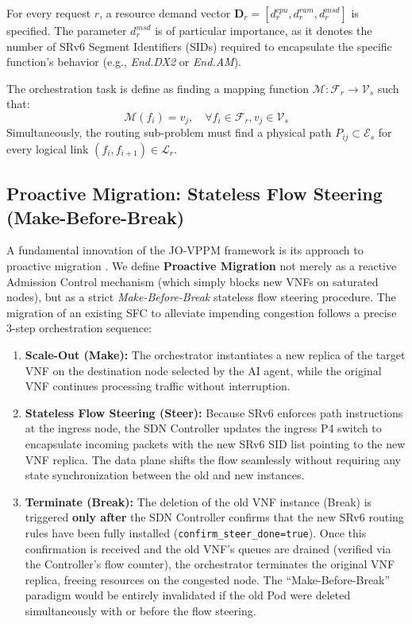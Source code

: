 \documentclass[12pt, a4paper, reqno, oneside]{book}
\begin{document}
For every request $r$, a resource demand vector $\mathbf{D}_r = [d_r^{cpu}, d_r^{ram}, d_r^{msd}]$ is specified. The parameter $d_r^{msd}$ is of particular importance, as it denotes the number of SRv6 Segment Identifiers (SIDs) required to encapsulate the specific function's behavior (e.g., \textit{End.DX2} or \textit{End.AM}).

The orchestration task is define as finding a mapping function $\mathcal{M}: \mathcal{F}_r \to \mathcal{V}_s$ such that:
\begin{equation}
\mathcal{M}(f_i) = v_j, \quad \forall f_i \in \mathcal{F}_r, v_j \in \mathcal{V}_s
\end{equation}
Simultaneously, the routing sub-problem must find a physical path $P_{ij} \subset \mathcal{E}_s$ for every logical link $(f_i, f_{i+1}) \in \mathcal{L}_r$.

\subsection{Proactive Migration: Stateless Flow Steering (Make-Before-Break)}
A fundamental innovation of the JO-VPPM framework is its approach to proactive migration \cite{moshiri2026proactive}. We define \textbf{Proactive Migration} not merely as a reactive Admission Control mechanism (which simply blocks new VNFs on saturated nodes), but as a strict \textit{Make-Before-Break} stateless flow steering procedure. The migration of an existing SFC to alleviate impending congestion follows a precise 3-step orchestration sequence:

\begin{enumerate}
    \item \textbf{Scale-Out (Make):} The orchestrator instantiates a new replica of the target VNF on the destination node selected by the AI agent, while the original VNF continues processing traffic without interruption.
    \item \textbf{Stateless Flow Steering (Steer):} Because SRv6 enforces path instructions at the ingress node, the SDN Controller updates the ingress P4 switch to encapsulate incoming packets with the new SRv6 SID list pointing to the new VNF replica. The data plane shifts the flow seamlessly without requiring any state synchronization between the old and new instances.
    \item \textbf{Terminate (Break):} The deletion of the old VNF instance (Break) is triggered \textbf{only after} the SDN Controller confirms that the new SRv6 routing rules have been fully installed (\texttt{confirm\_steer\_done=true}). Once this confirmation is received and the old VNF's queues are drained (verified via the Controller's flow counter), the orchestrator terminates the original VNF replica, freeing resources on the congested node. The ``Make-Before-Break'' paradigm would be entirely invalidated if the old Pod were deleted simultaneously with or before the flow steering.
\end{enumerate}
\end{document}
